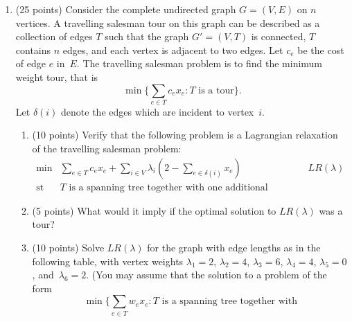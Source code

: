\begin{enumerate}
   \item (25 points)
         Consider the complete undirected graph $G=(V,E)$ on $n$ vertices.
         A travelling salesman tour on this graph
         can be described as a collection of edges
         $T$ such that the graph $G'=(V,T)$ is connected,
         $T$ contains $n$ edges, and each vertex is adjacent to two edges.
         Let $c_e$ be the cost of edge $e$ in~$E$.
         The travelling salesman problem is to find the minimum weight tour,
         that is
         \begin{displaymath}
            \min\{\sum_{e \in T}c_ex_e : \mbox{$T$ is a tour}\}.
         \end{displaymath}
         Let $\delta(i)$ denote the edges which are incident to vertex~$i$.
         \begin{enumerate}
           \item (10 points)
              Verify that the following problem is a Lagrangian
              relaxation of the travelling salesman problem:
              \begin{displaymath}
                \begin{array}{llr}
                   \min      & \sum_{e \in  T}c_ex_e +
         \sum_{i \in V}\lambda_i(2-\sum_{e \in \delta(i)}x_e)
               &     \qquad  \qquad  LR(\lambda)  \\
                   \mbox{st } & \mbox{$T$ is a spanning tree together with
                                        one additional edge.}
                \end{array}
              \end{displaymath}
           \item (5 points)
              What would it imply if the optimal solution to $LR(\lambda)$
              was a tour?
           \item (10 points)
              Solve $LR(\lambda)$ for the graph with edge lengths as in
              the following table,
              with vertex weights $\lambda_1=2$, $\lambda_2=4$,
              $\lambda_3=6$, $\lambda_4=4$, $\lambda_5=0$, and~$\lambda_6=2$.
              (You may assume that the solution to a problem of the form
              \begin{displaymath}
                 \min\{\sum_{e \in T}w_ex_e :
                    \mbox{$T$ is a spanning tree together with
}
\end{displaymath}
\end{enumerate}
\end{enumerate}
